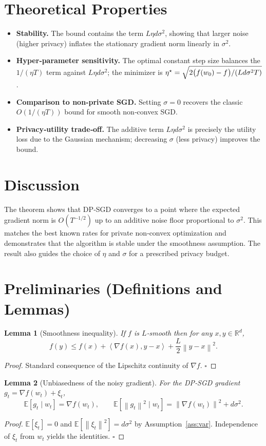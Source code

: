 \documentclass{article}
\newtheorem{lemma}{Lemma}
\newcommand{\EE}{\mathbb{E}}
\newcommand{\RR}{\mathbb{R}}
\newcommand{\norm}[1]{\left\lVert #1\right\rVert}
\newcommand{\inner}[2]{\left\langle #1,#2\right\rangle}
\begin{document}
\section*{Theoretical Properties}
\begin{itemize}
\item \textbf{Stability.} The bound contains the term $L\eta d\sigma^{2}$, showing that larger noise (higher privacy) inflates the stationary gradient norm linearly in $\sigma^{2}$.
\item \textbf{Hyper‑parameter sensitivity.} The optimal constant step size balances the $1/(\eta T)$ term against $L\eta d\sigma^{2}$; the minimizer is $\eta^{\star}= \sqrt{2\bigl(f(w_{0})-f^{\*}\bigr)/(L d\sigma^{2}T)}$.
\item \textbf{Comparison to non‑private SGD.} Setting $\sigma=0$ recovers the classic $O(1/(\eta T))$ bound for smooth non‑convex SGD.
\item \textbf{Privacy‑utility trade‑off.} The additive term $L\eta d\sigma^{2}$ is precisely the utility loss due to the Gaussian mechanism; decreasing $\sigma$ (less privacy) improves the bound.
\end{itemize}

\section*{Discussion}
The theorem shows that DP‑SGD converges to a point where the expected gradient norm is $O(T^{-1/2})$ up to an additive noise floor proportional to $\sigma^{2}$. This matches the best known rates for private non‑convex optimization and demonstrates that the algorithm is stable under the smoothness assumption. The result also guides the choice of $\eta$ and $\sigma$ for a prescribed privacy budget.

\newpage
\section*{Preliminaries (Definitions and Lemmas)}
\begin{lemma}[Smoothness inequality]\label{lem:smooth}
If $f$ is $L$‑smooth then for any $x,y\in\RR^{d}$,
\[
f(y)\le f(x)+\inner{\nabla f(x)}{y-x}+\frac{L}{2}\norm{y-x}^{2}.
\]
\end{lemma}
\begin{proof}
Standard consequence of the Lipschitz continuity of $\nabla f$. \hfill $\square$
\end{proof}
\begin{lemma}[Unbiasedness of the noisy gradient]\label{lem:unbiased}
For the DP‑SGD gradient $g_{t}= \nabla f(w_{t})+\xi_{t}$,
\[
\EE[g_{t}\mid w_{t}]=\nabla f(w_{t}),\qquad
\EE\!\left[\norm{g_{t}}^{2}\mid w_{t}\right]=\norm{\nabla f(w_{t})}^{2}+d\sigma^{2}.
\]
\end{lemma}
\begin{proof}
$\EE[\xi_{t}]=0$ and $\EE[\norm{\xi_{t}}^{2}]=d\sigma^{2}$ by Assumption~\ref{ass:var}. Independence of $\xi_{t}$ from $w_{t}$ yields the identities. \hfill $\square$
\end{proof}
\end{document}
